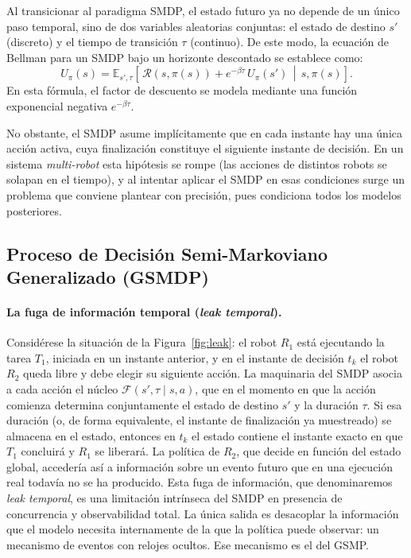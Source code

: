 Al transicionar al paradigma SMDP, el estado futuro ya no depende de un único paso temporal, sino de dos variables aleatorias conjuntas: el estado de destino $s'$ (discreto) y el tiempo de transición $\tau$ (continuo). De este modo, la ecuación de Bellman para un SMDP bajo un horizonte descontado se establece como:
\begin{equation} \label{eq:bellman-smdp} 
U_\pi(s)=\mathbb{E}_{s',\tau}\!\left[\,\mathcal{R}(s,\pi(s)) +e^{-\beta\tau}\,U_\pi(s')\,\middle|\,s,\pi(s)\right].
\end{equation}
En esta fórmula, el factor de descuento se modela mediante una función exponencial negativa $e^{-\beta\tau}$. 

No obstante, el SMDP asume implícitamente que en cada instante hay una única acción activa, cuya finalización constituye el siguiente instante de decisión. En un sistema \textit{multi-robot} esta hipótesis se rompe (las acciones de distintos robots se solapan en el tiempo), y al intentar aplicar el SMDP en esas condiciones surge un problema que conviene plantear con precisión, pues condiciona todos los modelos posteriores.


\subsection{Proceso de Decisión Semi-Markoviano Generalizado (GSMDP)} \label{subsec:gsmdp} %
 
\paragraph{La fuga de información temporal (\emph{leak temporal}).} Considérese la situación de la Figura~\ref{fig:leak}: el robot $R_1$ está ejecutando la tarea $T_1$, iniciada en un instante anterior, y en el instante de decisión $t_k$ el robot $R_2$ queda libre y debe elegir su siguiente acción. La maquinaria del SMDP asocia a cada acción el núcleo $\mathcal{F}(s',\tau\mid s,a)$, que en el momento en que la acción comienza determina conjuntamente el estado de destino $s'$ y la duración $\tau$. Si esa duración (o, de forma equivalente, el instante de finalización ya muestreado) se almacena en el estado, entonces en $t_k$ el estado contiene el instante exacto en que $T_1$ concluirá y $R_1$ se liberará. La política de $R_2$, que decide en función del estado global, accedería así a información sobre un evento futuro que en una ejecución real todavía no se ha producido. Esta fuga de información, que denominaremos \emph{leak temporal}, es una limitación intrínseca del SMDP en presencia de concurrencia y observabilidad total. La única salida es desacoplar la información que el modelo necesita internamente de la que la política puede observar: un mecanismo de
eventos con relojes ocultos. Ese mecanismo es el del GSMP.
 

